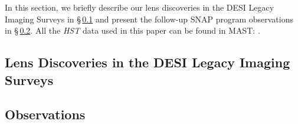 In this section, we briefly describe our lens discoveries in the DESI Legacy Imaging Surveys in \S\,\ref{sec:discovery} and present the follow-up \hst SNAP program observations in \S\,\ref{sec:hst-obs}.
All the {\it HST} data used in this paper can be found in MAST: .
\subsection{Lens Discoveries in the DESI Legacy Imaging Surveys }\label{sec:discovery}

\subsection{\HST Observations}\label{sec:hst-obs}
